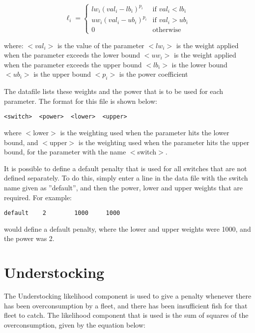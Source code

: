 \documentclass [a4paper, 10pt]{book}
\begin{document}
\begin{equation}\label{eq:bound}
\ell_{i} =
\begin{cases}
  lw_{i} (val_{i} - lb_{i})^{p_{i}}
  & \textrm{if $val_{i} < lb_i$}\\
  uw_{i} (val_{i} - ub_{i})^{p_{i}}
  & \textrm{if $val_{i} > ub_i$}\\
  0
  & \textrm{otherwise}
\end{cases}
\end{equation}

where:\newline
$<val_i>$ is the value of the parameter\newline
$<lw_i>$ is the weight applied when the parameter exceeds the lower bound\newline
$<uw_i>$ is the weight applied when the parameter exceeds the upper bound\newline
$<lb_i>$ is the lower bound\newline
$<ub_i>$ is the upper bound\newline
$<p_i>$ is the power coefficient

\bigskip
The datafile lists these weights and the power that is to be used for each parameter.  The format for this file is shown below:

{\small\begin{verbatim}
<switch>  <power>  <lower>  <upper>
\end{verbatim}}

where $<$lower$>$ is the weighting used when the parameter hits the lower bound, and $<$upper$>$ is the weighting used when the parameter hits the upper bound, for the parameter with the name $<$switch$>$.

\bigskip
It is possible to define a default penalty that is used for all switches that are not defined separately.  To do this, simply enter a line in the data file with the switch name given as ''default'', and then the power, lower and upper weights that are required.  For example:

{\small\begin{verbatim}
default    2        1000     1000
\end{verbatim}}

would define a default penalty, where the lower and upper weights were 1000, and the power was 2.

\section{Understocking}\label{sec:understocking}
The Understocking likelihood component is used to give a penalty whenever there has been overconsumption by a fleet, and there has been insufficient fish for that fleet to catch.  The likelihood component that is used is the sum of squares of the overconsumption, given by the equation below:
\end{document}
